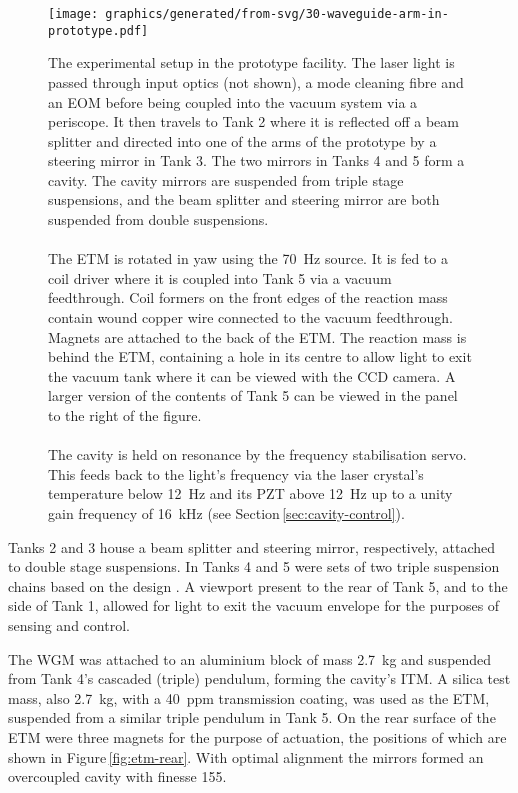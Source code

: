 \begin{figure}
  \centering
  \texttt{[image: graphics/generated/from-svg/30-waveguide-arm-in-prototype.pdf]}
  \caption[Experimental setup for measurement of waveguide transverse to longitudinal coupling]{\label{fig:prototype-setup}The experimental setup in the prototype facility. The laser light is passed through input optics (not shown), a mode cleaning fibre and an \gls{EOM} before being coupled into the vacuum system via a periscope. It then travels to Tank 2 where it is reflected off a beam splitter and directed into one of the arms of the prototype by a steering mirror in Tank 3. The two mirrors in Tanks 4 and 5 form a \FP{} cavity. The cavity mirrors are suspended from triple stage suspensions, and the beam splitter and steering mirror are both suspended from double suspensions. \\
  \\The \gls{ETM} is rotated in yaw using the \SI{70}{\hertz} source. It is fed to a coil driver where it is coupled into Tank 5 via a vacuum feedthrough. Coil formers on the front edges of the reaction mass contain wound copper wire connected to the vacuum feedthrough. Magnets are attached to the back of the \gls{ETM}. The reaction mass is behind the \gls{ETM}, containing a hole in its centre to allow light to exit the vacuum tank where it can be viewed with the CCD camera. A larger version of the contents of Tank 5 can be viewed in the panel to the right of the figure. \\
  \\The cavity is held on resonance by the frequency stabilisation servo. This feeds back to the light's frequency via the laser crystal's temperature below \SI{12}{\hertz} and its PZT above \SI{12}{\hertz} up to a unity gain frequency of \SI{16}{\kilo\hertz} (see Section\,\ref{sec:cavity-control}).}
\end{figure}

Tanks 2 and 3 house a beam splitter and steering mirror, respectively, attached to double stage suspensions. In Tanks 4 and 5 were sets of two triple suspension chains based on the \GEO{} design \cite{Plissi2000}. A viewport present to the rear of Tank 5, and to the side of Tank 1, allowed for light to exit the vacuum envelope for the purposes of sensing and control.

The \gls{WGM} was attached to an aluminium block of mass \SI{2.7}{\kilo\gram} and suspended from Tank 4's cascaded (triple) pendulum, forming the cavity's \gls{ITM}. A silica test mass, also \SI{2.7}{\kilo\gram}, with a \SI{40}{ppm} transmission coating, was used as the \gls{ETM}, suspended from a similar triple pendulum in Tank 5. On the rear surface of the \gls{ETM} were three magnets for the purpose of actuation, the positions of which are shown in Figure\,\ref{fig:etm-rear}. With optimal alignment the mirrors formed an overcoupled cavity with finesse \num{155}.

